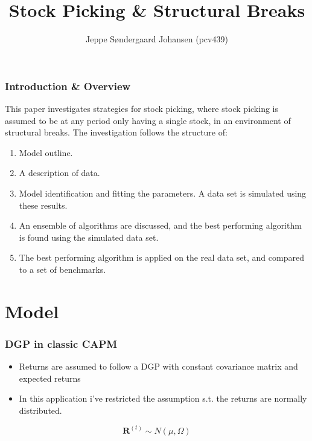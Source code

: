 \documentclass{beamer}
\title{Stock Picking \& Structural Breaks}
\author{Jeppe Søndergaard Johansen (pcv439)}
\newcommand{\RR}{\mathbf{R}}
\begin{document}
\maketitle

\begin{frame}
\tableofcontents
\end{frame}

\begin{frame}
\frametitle{Introduction \& Overview}

This paper investigates strategies for stock picking, where stock picking is assumed to be at any period only having a single stock, in an environment of structural breaks. The investigation follows the structure of:
\begin{enumerate}
    \item Model outline.
    \item A description of data.
    \item Model identification and fitting the parameters. A data set is simulated using these results.
    \item An ensemble of algorithms are discussed, and the best performing algorithm is found using the simulated data set.
    \item The best performing algorithm is applied on the real data set, and compared to a set of benchmarks.
\end{enumerate}

\end{frame}


\section{Model}

\begin{frame}
\frametitle{DGP in classic CAPM}

\begin{itemize}
    \item Returns are assumed to follow a DGP with constant covariance matrix and expected returns
    \item In this application i've restricted the assumption s.t. the returns are normally distributed.
\end{itemize}

\begin{equation}
    \RR^{(t)} \sim N(\mu, \Omega)
\end{equation}

\end{frame}
\end{document}
